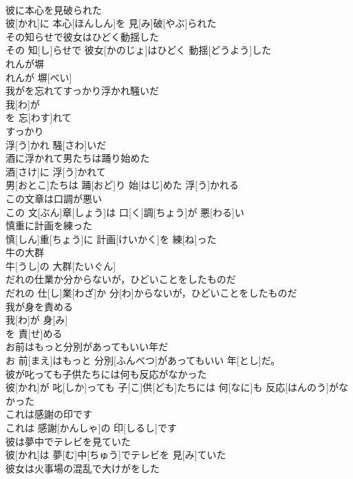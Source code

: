 \documentclass[8pt]{extreport}
\begin{document}
\begin{CJK}{UTF8}{min}
\\	彼に本心を見破られた	
\\	彼[かれ]に 本心[ほんしん]を 見[み]破[やぶ]られた
\\	その知らせで彼女はひどく動揺した	
\\	その 知[し]らせで 彼女[かのじょ]はひどく 動揺[どうよう]した
\\	れんが塀	
\\	れんが 塀[べい]
\\	我がを忘れてすっかり浮かれ騒いだ	
\\	我[わ]が 
\\	を 忘[わす]れて 
\\	すっかり 
\\	浮[う]かれ 騒[さわ]いだ
\\	酒に浮かれて男たちは踊り始めた	
\\	酒[さけ]に 浮[う]かれて 
\\	男[おとこ]たちは 踊[おど]り 始[はじ]めた 浮[う]かれる 
\\	この文章は口調が悪い	
\\	この 文[ぶん]章[しょう]は 口[く]調[ちょう]が 悪[わる]い
\\	慎重に計画を練った	
\\	慎[しん]重[ちょう]に 計画[けいかく]を 練[ね]った
\\	牛の大群	
\\	牛[うし]の 大群[たいぐん]
\\	だれの仕業か分からないが，ひどいことをしたものだ	
\\	だれの 仕[し]業[わざ]か 分[わ]からないが，ひどいことをしたものだ
\\	我が身を責める	
\\	我[わ]が 身[み]
\\	を 責[せ]める 
\\	お前はもっと分別があってもいい年だ	
\\	お 前[まえ]はもっと 分別[ふんべつ]があってもいい 年[とし]だ。
\\	彼が叱っても子供たちには何も反応がなかった	
\\	彼[かれ]が 叱[しか]っても 子[こ]供[ども]たちには 何[なに]も 反応[はんのう]がなかった
\\	これは感謝の印です	
\\	これは 感謝[かんしゃ]の 印[しるし]です
\\	彼は夢中でテレビを見ていた	
\\	彼[かれ]は 夢[む]中[ちゅう]でテレビを 見[み]ていた
\\	彼女は火事場の混乱で大けがをした	

\end{CJK}
\end{document}
